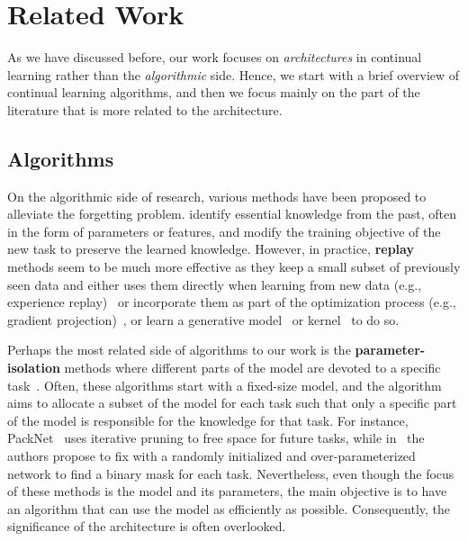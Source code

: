 \section{Related Work}

As we have discussed before, our work focuses on \emph{architectures} in continual learning rather than the \emph{algorithmic} side. Hence, we start with a brief overview of continual learning algorithms, and then we focus mainly on the part of the literature that is more related to the architecture.

\subsection{Algorithms}
On the algorithmic side of research, various methods have been proposed to alleviate the forgetting problem. \citep{zenke2017continual,ewc,mirzadeh2021linear,yin2020optimization} identify essential knowledge from the past, often in the form of parameters or features, and modify the training objective of the new task to preserve the learned knowledge. However, in practice, \textbf{replay} methods seem to be much more effective as they keep a small subset of previously seen data and either uses them directly when learning from new data (e.g., experience replay)~\citep{Chaudhry2019OnTE,rolnick2018experience,riemer2018learning} or incorporate them as part of the optimization process (e.g., gradient projection)~\citep{farajtabar2020orthogonal,chaudhry2018efficient,balaji2020effectiveness}, or learn a generative model~\citep{shin2017continual,kirichenko2021task} or kernel~\citep{DBLP:conf/icml/DerakhshaniZ0S21} to do so. 

Perhaps the most related side of algorithms to our work is the \textbf{parameter-isolation} methods where different parts of the model are devoted to a specific task~\citep{yoon2018lifelong,PackNet,SuperMaskInSuperPosition}. Often, these algorithms start with a fixed-size model, and the algorithm aims to allocate a subset of the model for each task such that only a specific part of the model is responsible for the knowledge for that task. For instance, PackNet~\citep{PackNet} uses iterative pruning to free space for future tasks, while in~\citep{SuperMaskInSuperPosition} the authors propose to fix with a randomly initialized and over-parameterized network to find a binary mask for each task. Nevertheless, even though the focus of these methods is the model and its parameters, the main objective is to have an algorithm that can use the model as efficiently as possible. Consequently, the significance of the architecture is often overlooked.

